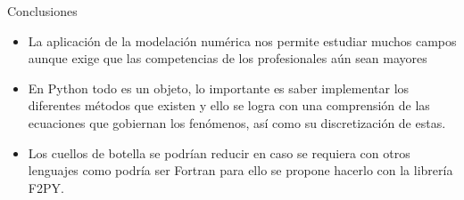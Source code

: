 \begin{frame}{Conclusiones}
\begin{itemize}
\item La aplicación de la modelación numérica nos permite estudiar muchos campos aunque exige que las competencias de los profesionales aún sean mayores
\medskip
\item En Python todo es un objeto, lo importante es saber implementar los diferentes métodos que existen y ello se logra con una comprensión de las ecuaciones que  gobiernan los fenómenos, así como su discretización de estas.
\medskip
\item Los cuellos de botella se podrían reducir en caso se requiera con otros lenguajes como podría ser Fortran para ello se propone hacerlo con la librería F2PY.
\end{itemize}
    
\end{frame}
